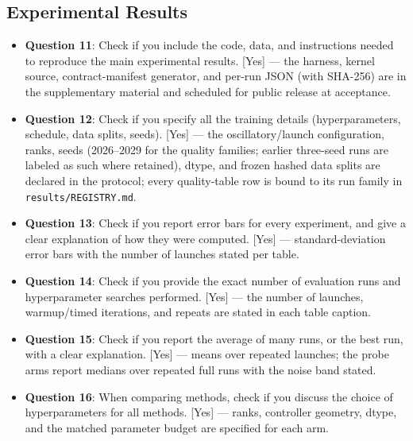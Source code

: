 \subsection*{Experimental Results}
\begin{itemize}
  \item \textbf{Question 11}: Check if you include the code, data, and
  instructions needed to reproduce the main experimental results.
  [Yes] — the harness, kernel source, contract-manifest generator, and
  per-run JSON (with SHA-256) are in the supplementary material and
  scheduled for public release at acceptance.
  \item \textbf{Question 12}: Check if you specify all the training details
  (hyperparameters, schedule, data splits, seeds).
  [Yes] — the oscillatory/launch configuration, ranks, seeds (2026--2029 for
  the quality families; earlier three-seed runs are labeled as such where
  retained), dtype, and frozen hashed data splits are declared in the
  protocol; every quality-table row is bound to its run family in
  \texttt{results/REGISTRY.md}.
  \item \textbf{Question 13}: Check if you report error bars for every
  experiment, and give a clear explanation of how they were computed.
  [Yes] — standard-deviation error bars with the number of launches stated
  per table.
  \item \textbf{Question 14}: Check if you provide the exact number of
  evaluation runs and hyperparameter searches performed.
  [Yes] — the number of launches, warmup/timed iterations, and repeats are
  stated in each table caption.
  \item \textbf{Question 15}: Check if you report the average of many
  runs, or the best run, with a clear explanation.
  [Yes] — means over repeated launches; the probe arms report medians over
  repeated full runs with the noise band stated.
  \item \textbf{Question 16}: When comparing methods, check if you discuss
  the choice of hyperparameters for all methods.
  [Yes] — ranks, controller geometry, dtype, and the matched parameter
  budget are specified for each arm.
\end{itemize}

